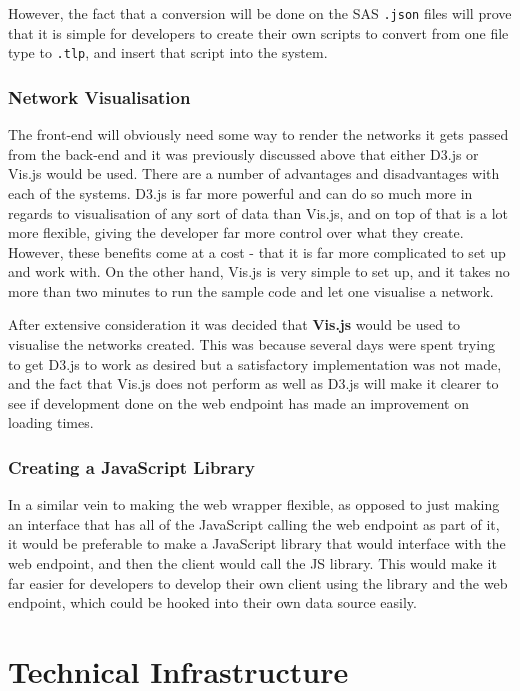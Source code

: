 \documentclass[../dissertation.tex]{subfiles}
\begin{document}
However, the fact that a conversion will be done on the SAS \texttt{.json} files will prove that it is simple for developers to create their own scripts to convert from one file type to \texttt{.tlp}, and insert that script into the system.

\subsubsection{Network Visualisation}

The front-end will obviously need some way to render the networks it gets passed from the back-end and it was previously discussed above that either D3.js or Vis.js would be used. There are a number of advantages and disadvantages with each of the systems. D3.js is far more powerful and can do so much more in regards to visualisation of any sort of data than Vis.js, and on top of that is a lot more flexible, giving the developer far more control over what they create. However, these benefits come at a cost - that it is far more complicated to set up and work with. On the other hand, Vis.js is very simple to set up, and it takes no more than two minutes to run the sample code and let one visualise a network. 

After extensive consideration it was decided that \textbf{Vis.js} would be used to visualise the networks created. This was because several days were spent trying to get D3.js to work as desired but a satisfactory implementation was not made, and the fact that Vis.js does not perform as well as D3.js will make it clearer to see if development done on the web endpoint has made an improvement on loading times.

\subsubsection{Creating a JavaScript Library}
In a similar vein to making the web wrapper flexible, as opposed to just making an interface that has all of the JavaScript calling the web endpoint as part of it, it would be preferable to make a JavaScript library that would interface with the web endpoint, and then the client would call the JS library. This would make it far easier for developers to develop their own client using the library and the web endpoint, which could be hooked into their own data source easily.

\section{Technical Infrastructure}
\end{document}
